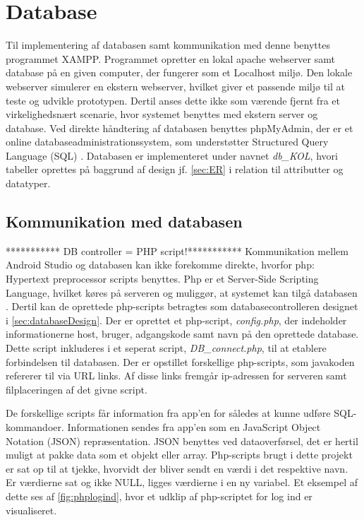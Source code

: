 \section{Database}
Til implementering af databasen samt kommunikation med denne benyttes programmet XAMPP. Programmet opretter en lokal apache webserver samt database på en given computer, der fungerer som et Localhost miljø. Den lokale webserver simulerer en ekstern webserver, hvilket giver et passende miljø til at teste og udvikle prototypen. Dertil anses dette ikke som værende fjernt fra et virkelighedsnært scenarie, hvor systemet benyttes med ekstern server og database.
Ved direkte håndtering af databasen benyttes phpMyAdmin, der er et online databaseadministrationssystem, som understøtter Structured Query Language (SQL) \cite{silbershatz2011}. 
Databasen er implementeret under navnet \textit{db\_KOL}, hvori tabeller oprettes på baggrund af design jf. \autoref{sec:ER} i relation til attributter og datatyper.

\subsection{Kommunikation med databasen}
*********** DB controller = PHP script!***********
Kommunikation mellem Android Studio og databasen kan ikke forekomme direkte, hvorfor php: Hypertext preprocessor scripts benyttes. Php er et Server-Side Scripting Language, hvilket køres på serveren og muliggør, at systemet kan tilgå databasen \cite{silbershatz2011}. Dertil kan de oprettede php-scripts betragtes som databasecontrolleren designet i \autoref{sec:databaseDesign}.
Der er oprettet et php-script, \textit{config.php}, der indeholder informationerne host, bruger, adgangskode samt navn på den oprettede database. Dette script inkluderes i et seperat script, \textit{DB\_connect.php}, til at etablere forbindelsen til databasen. Der er opstillet forskellige php-scripts, som javakoden refererer til via URL links. Af disse links fremgår ip-adressen for serveren samt filplaceringen af det givne script. 

De forskellige scripts får information fra app'en for således at kunne udføre SQL-kommandoer. Informationen sendes fra app'en som en JavaScript Object Notation (JSON) repræsentation. JSON benyttes ved dataoverførsel, det er hertil muligt at pakke data som et objekt eller array.\cite{silbershatz2011} Php-scripts brugt i dette projekt er sat op til at tjekke, hvorvidt der bliver sendt en værdi i det respektive navn. Er værdierne sat og ikke NULL, ligges værdierne i en ny variabel. Et eksempel af dette ses af \autoref{fig:phplogind}, hvor et udklip af php-scriptet for log ind er visualiseret. 

